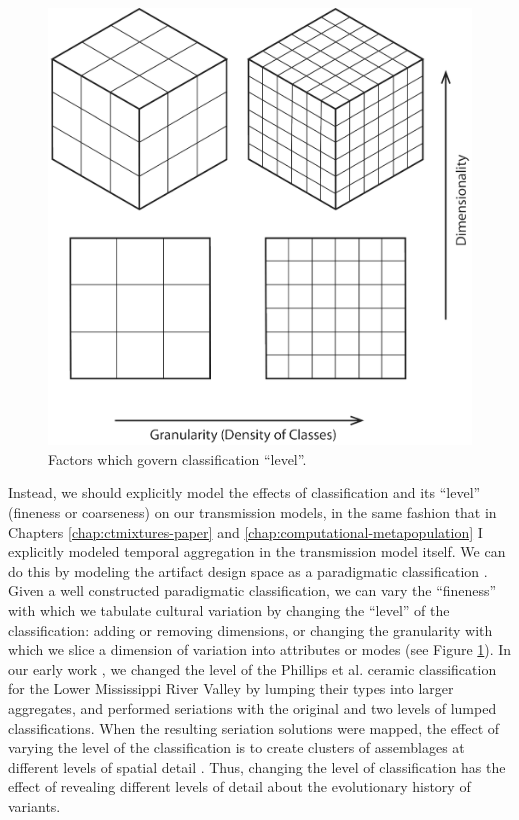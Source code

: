\begin{figure}[ht!]
  \centering
  \includegraphics[scale=0.5]{graphics/conclusion/classification-granularity-dimensionality.pdf}
  \caption{Factors which govern classification ``level''.}
  \label{conc:fig:classification-granularity}
\end{figure}

Instead, we should  explicitly model the effects of classification and its ``level'' (fineness or coarseness) on our transmission models, in the same fashion that in Chapters \ref{chap:ctmixtures-paper} and \ref{chap:computational-metapopulation} I explicitly modeled temporal aggregation in the transmission model itself.  We can do this by  modeling the artifact design space as a paradigmatic classification \citep{Dunnell1971,OBrien2015}.  Given a well constructed paradigmatic classification, we can vary the ``fineness'' with which we tabulate cultural variation by changing the ``level'' of the classification:  adding or removing dimensions, or changing the granularity with which we slice a dimension of variation into attributes or modes (see Figure \ref{conc:fig:classification-granularity}).  In our early work \citep{Lipo1997}, we changed the level of the Phillips et al. ceramic classification for the Lower Mississippi River Valley by lumping their types into larger aggregates, and performed seriations with the original and two levels of lumped classifications.  When the resulting seriation solutions were mapped, the effect of varying the level of the classification is to create clusters of assemblages at different levels of spatial detail \citep[Fig. 17]{Lipo1997}.  Thus, changing the level of classification has the effect of revealing different levels of detail about the evolutionary history of variants.  

